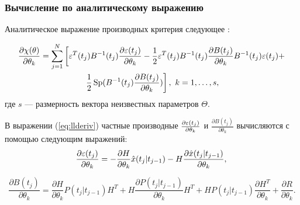 \documentclass[a4paper,14pt]{extarticle}
\DeclareMathOperator{\Sp}{Sp}
\let\oldref\ref
\renewcommand{\ref}[1]{(\oldref{#1})}
\begin{document}
\subsubsection{Вычисление по аналитическому выражению}


Аналитическое выражение производных критерия следующее \cite{denisov}:

\begin{multline}
	\label{eq:llderiv}
	\frac{\partial \chi(\theta)}{\partial \theta_k} = \sum\limits^{N}_{j=1}
	\left[
	\eps^{T}(t_j) B^{-1}(t_j) \frac{\partial \eps(t_j)}{\partial \theta_k} -
	\frac{1}{2} \eps^{T}(t_j) B^{-1}(t_j) \frac{\partial B(t_j)}{\partial \theta_k}
	B^{-1}(t_j) \eps(t_j) + \right.\\\left.
	\frac{1}{2}
	\Sp ( B^{-1}(t_j) \frac{\partial B(t_j)}{\partial \theta_k} )
	\right] ,\ k = 1,\ldots,s,
\end{multline}
где $s$ --- размерность вектора неизвестных параметров $\Theta$.

В выражении \ref{eq:llderiv} частные производные $\frac{\partial \varepsilon(t_j)}
{\partial \theta_k}$ и $\frac{\partial B(t_j)}{\partial \theta_k}$ вычисляются
с помощью следующим выражений:
\begin{equation}
\frac{\partial \varepsilon(t_j)}{\partial \theta_k} = - \frac{\partial H}
{\partial \theta_k} \hat{x}(t_j|t_{j-1}) - H \frac{\partial \hat{x}(t_j|t_{j-1})}
{\partial \theta_k},\\
\end{equation}

\begin{equation}
\frac{\partial B(t_j)}{\partial \theta_k} = \frac{\partial H}{\partial \theta_k}
P(t_j|t_{j-1}) H^T + H \frac{\partial P(t_j|t_{j-1})}{\partial \theta_k} H^T +
H P(t_j|t_{j-1}) \frac{\partial H^T}{\partial \theta_k} + \frac{\partial R}
{\partial \theta_k}.
\end{equation}
\end{document}
